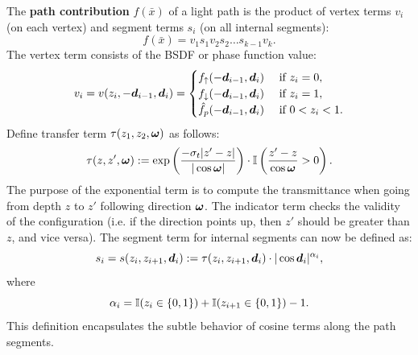 The {\bf path contribution} $f(\bar x)$ of a light path is the product of vertex terms $v_i$ (on each vertex) and segment terms $s_i$ (on all internal segments):
%
\begin{equation}
	f(\bar x) = v_1 s_1 v_2 s_2 \dots s_{k-1} v_k.
\end{equation}
%
The vertex term consists of the BSDF or phase function value:
%
%
\begin{equation}
\label{eqn:vtx_contrib}
v_i = v(z_i, -\bm{d}_{i - 1}, \bm{d}_i)
= \begin{cases}
	f_\uparrow(-\bm{d}_{i-1}, \bm{d}_i)   & \mbox{  if  } z_i = 0,\\
	f_\downarrow(-\bm{d}_{i-1}, \bm{d}_i) & \mbox{  if  } z_i = 1,\\
  	\hat{f}_p(-\bm{d}_{i-1}, \bm{d}_i)    & \mbox{  if  } 0 < z_i < 1.
\end{cases}
\end{equation}
%
Define  transfer term $\tau(z_1, z_2, \bm{\omega})$ as follows:
\begin{equation}
\tau(z, z', \bm{\omega}) := \exp \left( \frac{-\sigma_t |z' - z|}{|\cos \bm{\omega}|} \right) \cdot \mathbb{I} \left( \frac{z' - z}{\cos \bm{\omega}} > 0 \right).
\end{equation}
%
The purpose of the exponential term is to compute the transmittance when going from depth $z$ to $z'$ following direction $\bm{\omega}$.
The indicator term checks the validity of the configuration (i.e. if the direction points up, then $z'$ should be greater than $z$, and vice versa). The segment term for internal segments can now be defined as:
%
\begin{equation}
\label{eqn:seg_contrib}
s_i = s(z_i, z_{i + 1}, \bm{d}_i) := \tau(z_i, z_{i+1}, \bm{d}_i) \cdot |\cos \bm{d}_i|^{\alpha_i},
\end{equation}
where
\begin{equation}
\label{eqn:seg_contrib_cosine}
\alpha_i = \mathbb{I}(z_i \in \{0,1\}) + \mathbb{I}(z_{i + 1} \in \{0,1\}) - 1.
\end{equation}
%
This definition encapsulates the subtle behavior of cosine terms along the path segments.

